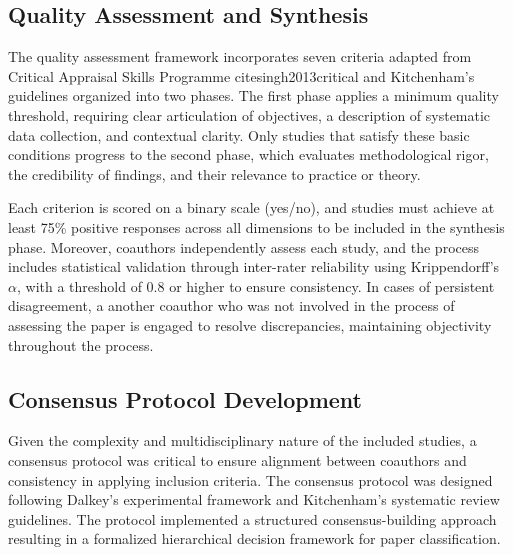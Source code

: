 \documentclass[acmsmall]{acmart}
\begin{document}
\subsection{Quality Assessment and Synthesis}\label{subsec:quality-assessment-and-synthesis}
The quality assessment framework incorporates seven criteria adapted from Critical Appraisal Skills Programme cite{singh2013critical}  and Kitchenham's guidelines organized into two phases. The first phase applies a minimum quality threshold, requiring clear articulation of objectives, a description of systematic data collection, and contextual clarity. Only studies that satisfy these basic conditions progress to the second phase, which evaluates methodological rigor, the credibility of findings, and their relevance to practice or theory.

Each criterion is scored on a binary scale (yes/no), and studies must achieve at least 75\% positive responses across all dimensions to be included in the synthesis phase. Moreover, coauthors independently assess each study, and the process includes statistical validation through inter-rater reliability using Krippendorff's $\alpha$, with a threshold of $0.8$ or higher to ensure consistency. In cases of persistent disagreement, a another coauthor who was not involved in the process of assessing the paper is engaged to resolve discrepancies, maintaining objectivity throughout the process.

\subsection{Consensus Protocol Development}\label{subsec:consensus-protocol-development}
Given the complexity and multidisciplinary nature of the included studies, a consensus protocol was critical to ensure alignment between coauthors and consistency in applying inclusion criteria.
The consensus protocol was designed following Dalkey's experimental framework \citep{dalkey1963experimental} and Kitchenham's systematic review guidelines. The protocol implemented a structured consensus-building approach resulting in a formalized hierarchical decision framework for paper classification.
\end{document}
